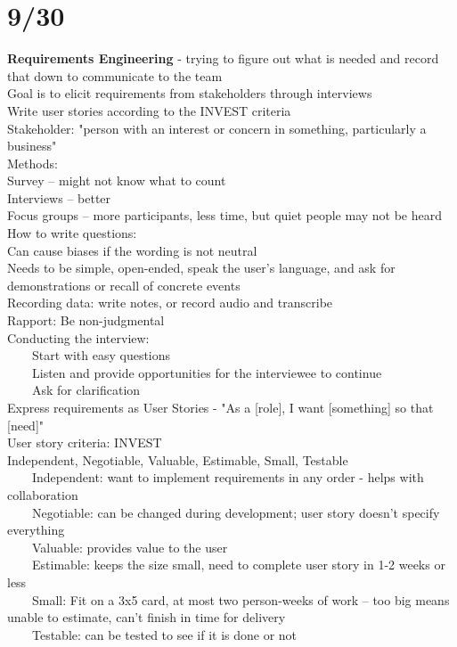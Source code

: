 \documentclass[10pt,letterpaper,unboxed,cm]{article}
\newcommand{\tab}{~~~~}
\begin{document}
\section{9/30}
\textbf{Requirements Engineering} - trying to figure out what is needed and record that down to communicate to the team\\
Goal is to elicit requirements from stakeholders through interviews\\
Write user stories according to the INVEST criteria\\
Stakeholder: "person with an interest or concern in something, particularly a business"\\
Methods: \\
Survey -- might not know what to count\\
Interviews -- better\\
Focus groups -- more participants, less time, but quiet people may not be heard\\
How to write questions: \\
Can cause biases if the wording is not neutral\\
Needs to be simple, open-ended, speak the user's language, and ask for demonstrations or recall of concrete events\\
Recording data: write notes, or record audio and transcribe\\
Rapport: Be non-judgmental\\
Conducting the interview: \\
\tab Start with easy questions\\
\tab Listen and provide opportunities for the interviewee to continue\\
\tab Ask for clarification\\
Express requirements as User Stories - "As a [role], I want [something] so that [need]"\\
User story criteria: INVEST\\
Independent, Negotiable, Valuable, Estimable, Small, Testable\\
\tab Independent: want to implement requirements in any order - helps with collaboration\\
\tab Negotiable: can be changed during development; user story doesn't specify everything\\
\tab Valuable: provides value to the user\\
\tab Estimable: keeps the size small, need to complete user story in 1-2 weeks or less\\
\tab Small: Fit on a 3x5 card, at most two person-weeks of work -- too big means unable to estimate, can't finish in time for delivery\\
\tab Testable: can be tested to see if it is done or not\\
\end{document}
